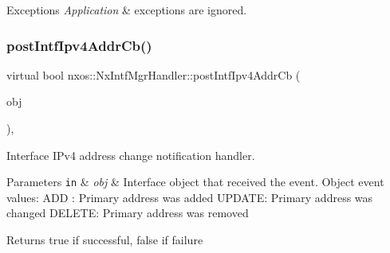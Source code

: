 \begin{DoxyExceptions}{Exceptions}
{\em Application} & exceptions are ignored. \\
\hline
\end{DoxyExceptions}
\mbox{\label{classnxos_1_1_nx_intf_mgr_handler_a8f96e0a3a70f5f566b8f0f5928bf5e64}} 
\subsubsection{\texorpdfstring{post\+Intf\+Ipv4\+Addr\+Cb()}{postIntfIpv4AddrCb()}}
{\footnotesize\ttfamily virtual bool nxos\+::\+Nx\+Intf\+Mgr\+Handler\+::post\+Intf\+Ipv4\+Addr\+Cb (\begin{DoxyParamCaption}\item[{\mbox{\hyperlink{classnxos_1_1_nx_intf}{Nx\+Intf}} $\ast$}]{obj }\end{DoxyParamCaption})\hspace{0.3cm}{\ttfamily [inline]}, {\ttfamily [virtual]}}

Interface I\+Pv4 address change notification handler. 
\begin{DoxyParams}[1]{Parameters}
\mbox{\tt in}  & {\em obj} & Interface object that received the event. Object event values\+: A\+DD \+: Primary address was added U\+P\+D\+A\+TE\+: Primary address was changed D\+E\+L\+E\+TE\+: Primary address was removed \\
\hline
\end{DoxyParams}
\begin{DoxyReturn}{Returns}
true if successful, false if failure
\end{DoxyReturn}

